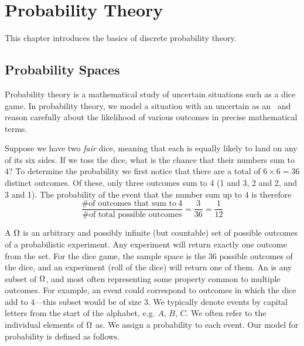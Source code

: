 \chapter{Probability Theory}
\label{ch:probability::theory}


\begin{preamble}
This chapter introduces the basics of discrete probability theory.
\end{preamble}

\section{Probability Spaces}
\label{sec:probability::theory::spaces}


Probability theory is a mathematical study of uncertain situations
such as a dice game.
%
In probability theory, we model a situation with an uncertain  as an~ and reason carefully about the likelihood of various outcomes in precise mathematical terms. 
%


\begin{example}
Suppose we have two \emph{fair} dice, meaning that each is equally
likely to land on any of its six sides.  If we toss the dice, what is
the chance that their numbers sum to $4$?  
%
To determine the probability we first notice that there are a total of 
$6 \times 6 = 36$ distinct outcomes.
%
Of these, only three outcomes sum to 4 (1 and 3, 2 and 2,
and 3 and 1).
%
The probability of the event that the number sum up to $4$ is therefore
\begin{equation*}
\frac
{\text{\# of outcomes that sum to}~4}
{\text{\# of total possible outcomes}} 
= 
\frac{3}{36} = \frac{1}{12}
\end{equation*}

\end{example}
%


\begin{gram}
A  $\Omega{}$ is an arbitrary and possibly infinite
(but countable) set of possible outcomes of a probabilistic
experiment.   Any experiment will return exactly one outcome from the set.
%
For the dice game, the sample space is the 36 possible outcomes of the
dice, and an experiment (roll of the dice) will return one of them.  
%
An  is any subset of $\Omega$, and
most often representing some property common to multiple outcomes.  
%
For example, an event could correspond to outcomes in which the dice
add to $4$---this subset would be of size $3$.
%
We typically denote events by capital letters from the start
of the alphabet, e.g. $A$, $B$, $C$.
%
We often refer to the individual elements of $\Omega{}$ as.
%
We assign a probability to each event.
%
Our model for probability is defined as follows.
\end{gram}

